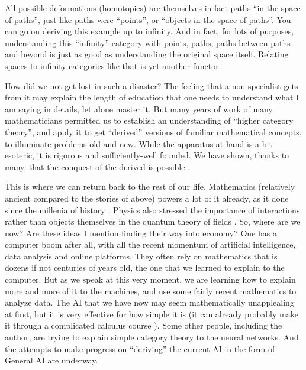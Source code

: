 \documentclass{article}
\begin{document}
All possible deformations (homotopies) are themselves in fact paths “in the space of paths”, just like paths were “points”, or “objects in the space of paths”. You can go on deriving this example up to infinity. And in fact, for lots of purposes, understanding this “infinity”-category with points, paths, paths between paths and beyond is just as good as understanding the original space itself. Relating spaces to infinity-categories like that is yet another functor.

How did we not get lost in such a disaster? The feeling that a non-specialist gets from it may explain the length of education that one needs to understand what I am saying in details, let alone master it. But many years of work of many mathematicians permitted us to establish an understanding of “higher category theory”, and apply it to get “derived” versions of familiar mathematical concepts, to illuminate problems old and new. While the apparatus at hand is a bit esoteric, it is rigorous and sufficiently-well founded. We have shown, thanks to many, that the conquest of the derived is possible \cite{LURIE}.

This is where we can return back to the rest of our life. Mathematics (relatively ancient compared to the stories of above) powers a lot of it already, as it done since the millenia of history \cite{CHILDE}. Physics also stressed the importance of interactions rather than objects themselves in the quantum theory of fields \cite{WEINBERG}. So, where are we now? Are these ideas I mention finding their way into economy? One has a computer boom after all, with all the recent momentum of artificial intelligence, data analysis and online platforms. They often rely on mathematics that is dozens if not centuries of years old, the one that we learned to explain to the computer. But as we speak at this very moment, we are learning how to explain more and more of it to the machines, and use some fairly recent mathematics to analyze data. The AI that we have now may seem mathematically unapplealing at first, but it is very effective for how simple it is (it can already probably make it through a complicated calculus course \cite{LAMPCHART}). Some other people, including the author, are trying to explain simple category theory to the neural networks. And the attempts to make progress on “deriving” the current AI in the form of General AI are underway.
\end{document}
